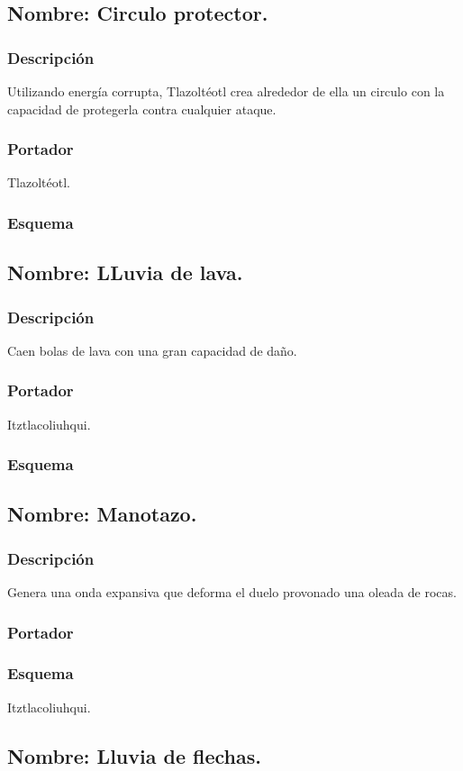 \documentclass[11pt,letterpaper]{article}
\begin{document}
\subsection{Nombre: Circulo protector.}
\subsubsection{Descripción}
Utilizando energía corrupta,  Tlazoltéotl crea alrededor de ella un circulo con la capacidad de protegerla contra cualquier ataque.
\subsubsection{Portador}
Tlazoltéotl.
\subsubsection{Esquema}
\subsection{Nombre: LLuvia de lava.}
\subsubsection{Descripción}
Caen bolas de lava con una gran capacidad de daño.
\subsubsection{Portador}
Itztlacoliuhqui.	
\subsubsection{Esquema}	
\subsection{Nombre: Manotazo.}
\subsubsection{Descripción}
Genera una onda expansiva que deforma el duelo provonado una oleada de rocas.
\subsubsection{Portador}
\subsubsection{Esquema}
Itztlacoliuhqui.
\subsection{Nombre: Lluvia de flechas.}
\end{document}
